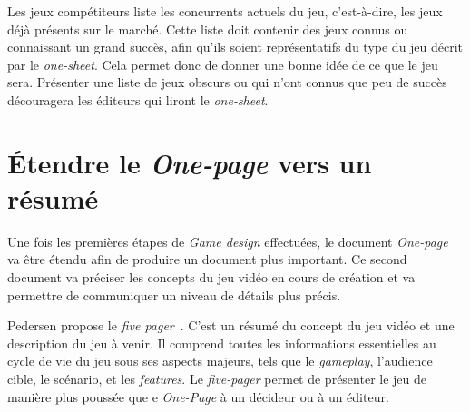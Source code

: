 
Les jeux compétiteurs liste les concurrents actuels du jeu, c'est-\`a-dire, les jeux déjà présents sur le marché.
Cette liste doit contenir des jeux connus ou connaissant un grand succès, afin qu'ils soient représentatifs du type du jeu d\'ecrit par le \emph{one-sheet}.
Cela permet donc de donner une bonne idée de ce que le jeu sera. 
Présenter une liste de jeux obscurs ou qui n'ont connus que peu de succès découragera les éditeurs qui liront le \emph{one-sheet}.







\section{Étendre le \emph{One-page} vers un résumé}
Une fois les premières étapes de \emph{Game design} effectuées, le document \emph{One-page} va être étendu afin de produire un document plus important.
Ce second document va préciser les concepts du jeu vidéo en cours de création et va permettre de communiquer un niveau de détails plus précis.

Pedersen propose le \emph{five pager}~\cite{GD_foundations_pedersen}. C'est un résumé du concept du jeu vidéo et une description du jeu à venir.
Il comprend toutes les informations essentielles au cycle de vie du jeu sous ses aspects majeurs, tels que le \emph{gameplay}, l'audience cible, le scénario, et les \emph{features}.
Le \emph{five-pager} permet de présenter le jeu de manière plus poussée que e \emph{One-Page} à un décideur ou à un éditeur.







